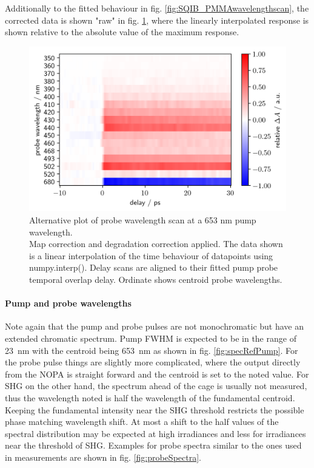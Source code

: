 \documentclass[twoside,openright,listof=numbered]{scrreprt}
\begin{document}
Additionally to the fitted behaviour in fig. \ref{fig:SQIB_PMMAwavelengthscan}, the corrected data is shown "raw" in fig. \ref{fig:SQIB_PMMA_rawWavs}, where the linearly interpolated response is shown relative to the absolute value of the maximum response.
\begin{figure}[htp]
\centering
\includegraphics[scale=1]{images/RawishDataWavelengthScanSHG.png}
\caption[Probe wavelength scan at a 653 nm pump wavelength with linear interpolation of time steps.]{Alternative plot of probe wavelength scan at a 653 nm pump wavelength.\\Map correction and degradation correction applied. The data shown is a linear interpolation of the time behaviour of datapoints using numpy.interp(). Delay scans are aligned to their fitted pump probe temporal overlap delay. Ordinate shows centroid probe wavelengths.\label{fig:SQIB_PMMA_rawWavs}}
\end{figure}
\paragraph{Pump and probe wavelengths}
Note again that the pump and probe pulses are not monochromatic but have an extended chromatic spectrum. Pump FWHM is expected to be in the range of \SI{23}{\nano\meter} with the centroid being \SI{653}{\nano\meter} as shown in fig. \ref{fig:specRefPump}. For the probe pulse things are slightly more complicated, where the output directly from the NOPA is straight forward and the centroid is set to the noted value. For SHG on the other hand, the spectrum ahead of the cage is usually not measured, thus the wavelength noted is half the wavelength of the fundamental centroid. Keeping the fundamental intensity near the SHG threshold restricts the possible phase matching wavelength shift. At most a shift to the half values of the spectral distribution may be expected at high irradiances and less for irradiances near the threshold of SHG. Examples for probe spectra similar to the ones used in measurements are shown in fig. \ref{fig:probeSpectra}.
\end{document}
